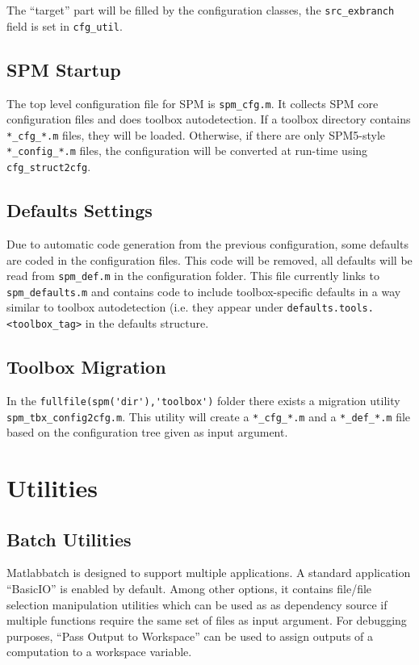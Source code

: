 The ``target'' part will be filled by the configuration classes, the
\verb|src_exbranch| field is set in \verb|cfg_util|.

\subsection{SPM Startup}

The top level configuration file for SPM is \verb|spm_cfg.m|. It collects SPM
core configuration files and does toolbox autodetection. If a toolbox
directory contains \verb|*_cfg_*.m| files, they will be loaded. Otherwise, if
there are only SPM5-style \verb|*_config_*.m| files, the configuration will be
converted at run-time using \verb|cfg_struct2cfg|.

\subsection{Defaults Settings}

Due to automatic code generation from the previous configuration, some
defaults are coded in the configuration files. This code will be removed, all
defaults will be read from \verb|spm_def.m| in the configuration folder. This
file currently links to \verb|spm_defaults.m| and contains code to include
toolbox-specific defaults in a way similar to toolbox autodetection (i.e. they
appear under \verb|defaults.tools.<toolbox_tag>| in the defaults structure.

\subsection{Toolbox Migration}

In the \verb|fullfile(spm('dir'),'toolbox')| folder there exists a migration
utility \verb|spm_tbx_config2cfg.m|. This utility will create a
\verb|*_cfg_*.m| and a \verb|*_def_*.m| file based on the configuration tree
given as input argument.

\section{Utilities}

\subsection{Batch Utilities}

Matlabbatch is designed to support multiple applications. A standard
application ``BasicIO'' is enabled by default. Among other options, it
contains file/file selection manipulation utilities which can be used as as
dependency source if multiple functions require the same set of files as input
argument. For debugging purposes, ``Pass Output to Workspace'' can be used to
assign outputs of a computation to a workspace variable.

